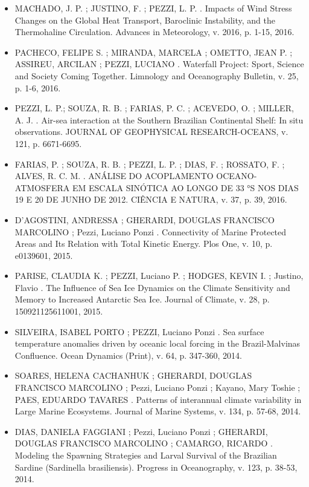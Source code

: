 \documentclass[11pt, a4paper]{awesome-cv}
\begin{document}
\begin{cvletter}
\begin{itemize}
  \item[] MACHADO, J. P. ; JUSTINO, F. ; PEZZI, L. P. . Impacts of Wind Stress 
  Changes on the Global Heat Transport, Baroclinic Instability, and the Thermohaline Circulation. 
  Advances in Meteorology, v. 2016, p. 1-15,
  2016.

  \item[] PACHECO, FELIPE S. ; MIRANDA, MARCELA ; OMETTO, JEAN P. ; ASSIREU, ARCILAN ; PEZZI, LUCIANO . 
  Waterfall Project: Sport, Science and Society Coming Together. Limnology and Oceanography Bulletin, 
  v. 25, p. 1-6, 2016.

  \item[] PEZZI, L. P.; SOUZA, R. B. ; FARIAS, P. C. ; ACEVEDO, O. ; MILLER, A. J. . Air-sea 
  interaction at the Southern Brazilian Continental Shelf: In situ observations. JOURNAL OF 
  GEOPHYSICAL RESEARCH-OCEANS, v. 121, p. 6671-6695.

  \item[] FARIAS, P. ; SOUZA, R. B. ; PEZZI, L. P. ; DIAS, F. ; ROSSATO, F. ; ALVES, R. C. M. . 
  ANÁLISE DO ACOPLAMENTO OCEANO-ATMOSFERA EM ESCALA SINÓTICA AO LONGO DE 33 °S NOS DIAS 19 E 20 DE 
  JUNHO DE 2012. CIÊNCIA E NATURA, v. 37, p. 39, 2016.

  \item[] D'AGOSTINI, ANDRESSA ; GHERARDI, DOUGLAS FRANCISCO MARCOLINO ; Pezzi, Luciano Ponzi . 
  Connectivity of Marine Protected Areas and Its Relation with Total Kinetic Energy. Plos One, v. 10, 
  p. e0139601, 2015.

  \item[] PARISE, CLAUDIA K. ; PEZZI, Luciano P. ; HODGES, KEVIN I. ; Justino, Flavio . The Influence 
  of Sea Ice Dynamics on the Climate Sensitivity and Memory to Increased Antarctic Sea Ice. 
  Journal of Climate, v. 28, p. 150921125611001,
  2015.

  \item[] SILVEIRA, ISABEL PORTO ; PEZZI, Luciano Ponzi . Sea surface temperature anomalies driven by
  oceanic local forcing in the Brazil-Malvinas Confluence. Ocean Dynamics (Print), v. 64, p. 347-360, 
  2014.

  \item[] SOARES, HELENA CACHANHUK ; GHERARDI, DOUGLAS FRANCISCO MARCOLINO ; Pezzi, Luciano Ponzi ; 
  Kayano, Mary Toshie ; PAES, EDUARDO TAVARES . Patterns of interannual climate variability in Large 
  Marine Ecosystems. Journal of Marine Systems, v. 134, p. 57-68,
  2014.

  \item[] DIAS, DANIELA FAGGIANI ; Pezzi, Luciano Ponzi ; GHERARDI, DOUGLAS FRANCISCO MARCOLINO ; 
  CAMARGO, RICARDO . Modeling the Spawning Strategies and Larval Survival of the Brazilian Sardine 
  (Sardinella brasiliensis). Progress in Oceanography, v. 123, p. 38-53,
  2014.


\end{itemize}
\end{cvletter}
\end{document}
